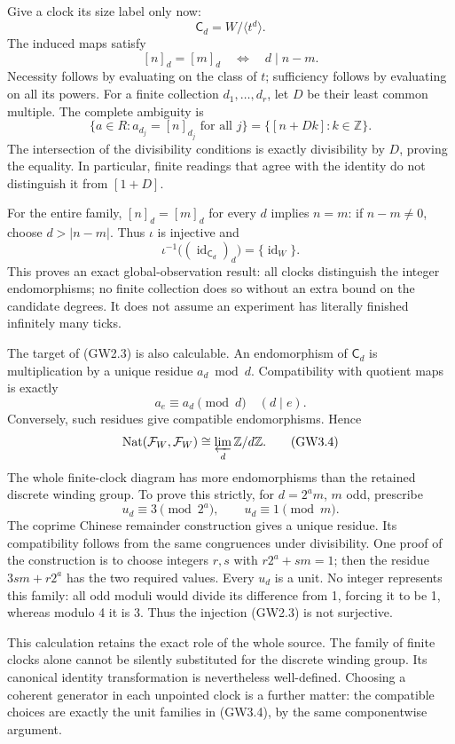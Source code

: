 Give a clock its size label only now: \[
\mathsf C_d=W/\langle t^d\rangle.
\] The induced maps satisfy \[
[n]_d=[m]_d\quad\Longleftrightarrow\quad d\mid n-m.
\tag{GW3.1}
\] Necessity follows by evaluating on the class of \(t\); sufficiency
follows by evaluating on all its powers. For a finite collection
\(d_1,\ldots,d_r\), let \(D\) be their least common multiple. The
complete ambiguity is \[
\{a\in R:a_{d_j}=[n]_{d_j}\text{ for all }j\}
=\{[n+Dk]:k\in\mathbb Z\}.
\tag{GW3.2}
\] The intersection of the divisibility conditions is exactly
divisibility by \(D\), proving the equality. In particular, finite
readings that agree with the identity do not distinguish it from
\([1+D]\).

For the entire family, \([n]_d=[m]_d\) for every \(d\) implies \(n=m\):
if \(n-m\ne0\), choose \(d>|n-m|\). Thus \(\iota\) is injective and \[
\iota^{-1}\bigl((\operatorname{id}_{\mathsf C_d})_d\bigr)
=\{\operatorname{id}_W\}.
\tag{GW3.3}
\] This proves an exact global-observation result: all clocks
distinguish the integer endomorphisms; no finite collection does so
without an extra bound on the candidate degrees. It does not assume an
experiment has literally finished infinitely many ticks.

The target of (GW2.3) is also calculable. An endomorphism of
\(\mathsf C_d\) is multiplication by a unique residue \(a_d\bmod d\).
Compatibility with quotient maps is exactly \[
a_e\equiv a_d\pmod d\quad(d\mid e).
\] Conversely, such residues give compatible endomorphisms. Hence \[
\operatorname{Nat}(\mathcal F_W,\mathcal F_W)
\cong\varprojlim_d\mathbb Z/d\mathbb Z.
\tag{GW3.4}
\] The whole finite-clock diagram has more endomorphisms than the
retained discrete winding group. To prove this strictly, for
\(d=2^a m\), \(m\) odd, prescribe \[
u_d\equiv3\pmod{2^a},\qquad u_d\equiv1\pmod m.
\] The coprime Chinese remainder construction gives a unique residue.
Its compatibility follows from the same congruences under divisibility.
One proof of the construction is to choose integers \(r,s\) with
\(r2^a+sm=1\); then the residue \(3sm+r2^a\) has the two required
values. Every \(u_d\) is a unit. No integer represents this family: all
odd moduli would divide its difference from 1, forcing it to be 1,
whereas modulo 4 it is 3. Thus the injection (GW2.3) is not surjective.

This calculation retains the exact role of the whole source. The family
of finite clocks alone cannot be silently substituted for the discrete
winding group. Its canonical identity transformation is nevertheless
well-defined. Choosing a coherent generator in each unpointed clock is a
further matter: the compatible choices are exactly the unit families in
(GW3.4), by the same componentwise argument.

